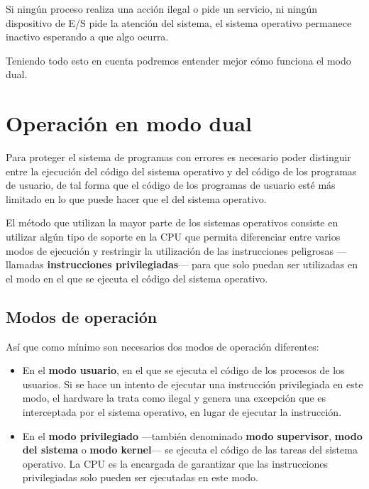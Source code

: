 Si ningún proceso realiza una acción ilegal o pide un servicio, ni
ningún dispositivo de E/S pide la atención del sistema, el sistema
operativo permanece inactivo esperando a que algo ocurra.

Teniendo todo esto en cuenta podremos entender mejor cómo funciona el
modo dual.

\section{Operación en modo dual}\label{_operaciuxf3n_en_modo_dual}

Para proteger el sistema de programas con errores es necesario poder
distinguir entre la ejecución del código del sistema operativo y del
código de los programas de usuario, de tal forma que el código de los
programas de usuario esté más limitado en lo que puede hacer que el del
sistema operativo.

El método que utilizan la mayor parte de los sistemas operativos
consiste en utilizar algún tipo de soporte en la CPU que permita
diferenciar entre varios modos de ejecución y restringir la utilización
de las instrucciones peligrosas ---llamadas \textbf{instrucciones
privilegiadas}{}--- para que solo puedan ser utilizadas en el modo en el
que se ejecuta el código del sistema operativo.

\subsection{Modos de operación}\label{_modos_de_operaciuxf3n}

Así que como mínimo son necesarios dos modos de operación diferentes:

\begin{itemize}
\item
  En el \textbf{modo usuario}{}, en el que se ejecuta el código de los
  procesos de los usuarios. Si se hace un intento de ejecutar una
  instrucción privilegiada en este modo, el hardware la trata como
  ilegal y genera una excepción que es interceptada por el sistema
  operativo, en lugar de ejecutar la instrucción.
\item
  En el \textbf{modo privilegiado}{} ---también denominado \textbf{modo
  supervisor}{}, \textbf{modo del sistema}{} o \textbf{modo kernel}{}---
  se ejecuta el código de las tareas del sistema operativo. La CPU es la
  encargada de garantizar que las instrucciones privilegiadas solo
  pueden ser ejecutadas en este modo.
\end{itemize}

